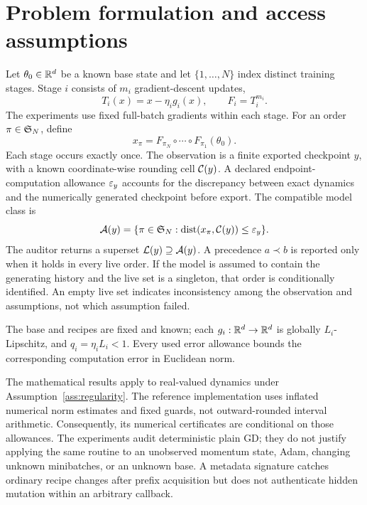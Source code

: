 \section{Problem formulation and access assumptions}
Let $\theta_0\in\mathbb{R}^d$ be a known base state and let $\{1,\ldots,N\}$ index distinct training stages. Stage $i$ consists of $m_i$ gradient-descent updates,
\begin{equation}
 T_i(x)=x-\eta_i g_i(x),\qquad F_i=T_i^{m_i}.
\end{equation}
The experiments use fixed full-batch gradients within each stage. For an order $\pi\in\mathfrak{S}_N$, define
\begin{equation}
 x_\pi=F_{\pi_N}\circ\cdots\circ F_{\pi_1}(\theta_0).
\end{equation}
Each stage occurs exactly once. The observation is a finite exported checkpoint $y$, with a known coordinate-wise rounding cell $\mathcal{C}(y)$. A declared endpoint-computation allowance $\varepsilon_y$ accounts for the discrepancy between exact dynamics and the numerically generated checkpoint before export. The compatible model class is
\begin{equation}\label{eq:compatible}
 \mathcal{A}(y)=\{\pi\in\mathfrak{S}_N:\operatorname{dist}(x_\pi,\mathcal{C}(y))\leq\varepsilon_y\}.
\end{equation}
The auditor returns a superset $\mathcal{L}(y)\supseteq\mathcal{A}(y)$. A precedence $a\prec b$ is reported only when it holds in every live order. If the model is assumed to contain the generating history and the live set is a singleton, that order is conditionally identified. An empty live set indicates inconsistency among the observation and assumptions, not which assumption failed.

\begin{assumption}\label{ass:regularity}
The base and recipes are fixed and known; each $g_i:\mathbb{R}^d\to\mathbb{R}^d$ is globally $L_i$-Lipschitz, and $q_i=\eta_i L_i<1$. Every used error allowance bounds the corresponding computation error in Euclidean norm.
\end{assumption}
The mathematical results apply to real-valued dynamics under Assumption~\ref{ass:regularity}. The reference implementation uses inflated numerical norm estimates and fixed guards, not outward-rounded interval arithmetic. Consequently, its numerical certificates are conditional on those allowances. The experiments audit deterministic plain GD; they do not justify applying the same routine to an unobserved momentum state, Adam, changing unknown minibatches, or an unknown base. A metadata signature catches ordinary recipe changes after prefix acquisition but does not authenticate hidden mutation within an arbitrary callback.

